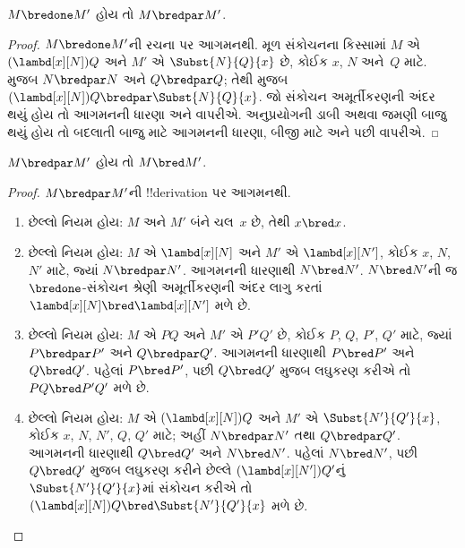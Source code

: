 \documentclass[../../../include/open-logic-section]{subfiles}
\begin{document}


\begin{lem}
  $M \bredone M'$ હોય તો $M \bredpar M'$.
\end{lem}
\begin{proof}
  $M \bredone M'$ની રચના પર આગમનથી. મૂળ સંકોચનના
  કિસ્સામાં $M$ એ $(\lambd[x][N])Q$ અને
  $M'$ એ $\Subst{N}{Q}{x}$ છે, કોઈક
  $x$, $N$ અને~$Q$ માટે. 
  મુજબ $N \bredpar N$ અને $Q \bredpar Q$;
  તેથી 
  મુજબ $(\lambd[x][N])Q \bredpar
  \Subst{N}{Q}{x}$. જો સંકોચન અમૂર્તીકરણની અંદર
  થયું હોય તો આગમનની ધારણા અને
   વાપરીએ. અનુપ્રયોગની
  ડાબી અથવા જમણી બાજુ થયું હોય તો બદલાતી બાજુ
  માટે આગમનની ધારણા, બીજી માટે
   અને પછી
   વાપરીએ.
\end{proof}

\begin{lem}
  $M \bredpar M'$ હોય તો $M \bred M'$.
\end{lem}

\begin{proof}
  $M \bredpar M'$ની !!{derivation} પર આગમનથી.
  \begin{enumerate}
  \item છેલ્લો નિયમ  હોય:
    $M$ અને $M'$ બંને ચલ~$x$ છે, તેથી $x \bred x$.
  \item છેલ્લો નિયમ  હોય:
    $M$ એ $\lambd[x][N]$ અને $M'$ એ
    $\lambd[x][N']$, કોઈક $x$, $N$, $N'$ માટે,
    જ્યાં $N \bredpar N'$. આગમનની ધારણાથી
    $N \bred N'$. $N \bred N'$ની જ $\bredone$-સંકોચન શ્રેણી
    અમૂર્તીકરણની અંદર
    લાગુ કરતાં $\lambd[x][N] \bred
    \lambd[x][N']$ મળે છે.
  \item છેલ્લો નિયમ  હોય:
    $M$ એ $PQ$ અને $M'$ એ $P'Q'$ છે,
    કોઈક $P$, $Q$, $P'$, $Q'$ માટે, જ્યાં
    $P \bredpar P'$ અને $Q \bredpar Q'$.
    આગમનની ધારણાથી $P \bred P'$ અને
    $Q \bred Q'$. પહેલાં $P \bred P'$,
    પછી $Q \bred Q'$ મુજબ લઘુકરણ કરીએ તો
    $PQ \bred P'Q'$ મળે છે.
  \item છેલ્લો નિયમ  હોય:
    $M$ એ $(\lambd[x][N])Q$ અને
    $M'$ એ $\Subst{N'}{Q'}{x}$, કોઈક
    $x$, $N$, $N'$, $Q$, $Q'$ માટે; અહીં
    $N \bredpar N'$ તથા $Q \bredpar Q'$.
    આગમનની ધારણાથી $Q \bred Q'$ અને
    $N \bred N'$. પહેલાં $N \bred N'$, પછી
    $Q \bred Q'$ મુજબ લઘુકરણ કરીને છેલ્લે
    $(\lambd[x][N'])Q'$નું
    $\Subst{N'}{Q'}{x}$માં સંકોચન કરીએ તો
    $(\lambd[x][N])Q \bred
    \Subst{N'}{Q'}{x}$ મળે છે.
  \end{enumerate}
\end{proof}
\end{document}
